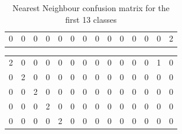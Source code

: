 \documentclass[10pt,twocolumn,letterpaper]{article}
\begin{document}
\begin{table}[h]
\begin{tabular}{llllllllllllll}
0                         & 0                         & 0                         & 0                         & 0                         & 0                         & 0                         & 0                         & 0                         & 0                         & 0                         & 0                         & 0                         & \cellcolor[HTML]{9AFF99}2
\end{tabular}
    \caption{Nearest Neighbour confusion matrix for the first 13 classes}
    \label{tab:NN_confusion_matrix}
\end{table}

\begin{table}[h]
\centering
\begin{tabular}{llllllllllllll}
\cellcolor[HTML]{9AFF99}2 & 0                         & 0                         & 0                         & 0                         & 0                         & 0                         & 0                         & 0                         & 0                         & 0                         & 0                         & 1                         & 0                         \\
0                         & \cellcolor[HTML]{9AFF99}2 & 0                         & 0                         & 0                         & 0                         & 0                         & 0                         & 0                         & 0                         & 0                         & 0                         & 0                         & 0                         \\
0                         & 0                         & \cellcolor[HTML]{9AFF99}2 & 0                         & 0                         & 0                         & 0                         & 0                         & 0                         & 0                         & 0                         & 0                         & 0                         & 0                         \\
0                         & 0                         & 0                         & \cellcolor[HTML]{9AFF99}2 & 0                         & 0                         & 0                         & 0                         & 0                         & 0                         & 0                         & 0                         & 0                         & 0                         \\
0                         & 0                         & 0                         & 0                         & \cellcolor[HTML]{9AFF99}2 & 0                         & 0                         & 0                         & 0                         & 0                         & 0                         & 0                         & 0                         & 0                         \\

\end{tabular}
\end{table}
\end{document}

